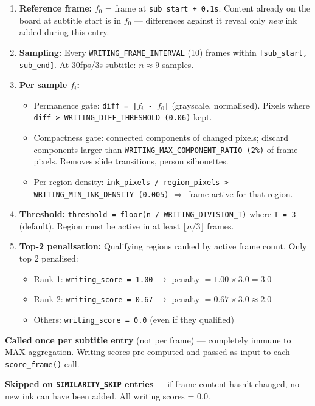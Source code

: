 \documentclass[11pt]{article}
\begin{document}
\begin{enumerate}[leftmargin=1.2em]
    \item \textbf{Reference frame:} $f_0$ = frame at \texttt{sub\_start + 0.1s}. Content already on the board at subtitle start is in $f_0$ --- differences against it reveal only \emph{new} ink added during this entry.
    \item \textbf{Sampling:} Every \texttt{WRITING\_FRAME\_INTERVAL} (10) frames within \texttt{[sub\_start, sub\_end]}. At 30fps/3s subtitle: $n \approx 9$ samples.
    \item \textbf{Per sample $f_i$:}
    \begin{itemize}
        \item Permanence gate: \texttt{diff = |$f_i$ - $f_0$|} (grayscale, normalised). Pixels where \texttt{diff > WRITING\_DIFF\_THRESHOLD (0.06)} kept.
        \item Compactness gate: connected components of changed pixels; discard components larger than \texttt{WRITING\_MAX\_COMPONENT\_RATIO (2\%)} of frame pixels. Removes slide transitions, person silhouettes.
        \item Per-region density: \texttt{ink\_pixels / region\_pixels > WRITING\_MIN\_INK\_DENSITY (0.005)} $\Rightarrow$ frame active for that region.
    \end{itemize}
    \item \textbf{Threshold:} \texttt{threshold = floor(n / WRITING\_DIVISION\_T)} where \texttt{T = 3} (default). Region must be active in at least $\lfloor n/3 \rfloor$ frames.
    \item \textbf{Top-2 penalisation:} Qualifying regions ranked by active frame count. Only top 2 penalised:
    \begin{itemize}
        \item Rank 1: \texttt{writing\_score = 1.00} $\rightarrow$ penalty $= 1.00 \times 3.0 = 3.0$
        \item Rank 2: \texttt{writing\_score = 0.67} $\rightarrow$ penalty $= 0.67 \times 3.0 \approx 2.0$
        \item Others: \texttt{writing\_score = 0.0} (even if they qualified)
    \end{itemize}
\end{enumerate}

\textbf{Called once per subtitle entry} (not per frame) --- completely immune to MAX aggregation. Writing scores pre-computed and passed as input to each \texttt{score\_frame()} call.

\textbf{Skipped on \texttt{SIMILARITY\_SKIP} entries} --- if frame content hasn't changed, no new ink can have been added. All writing scores = 0.0.
\end{document}
